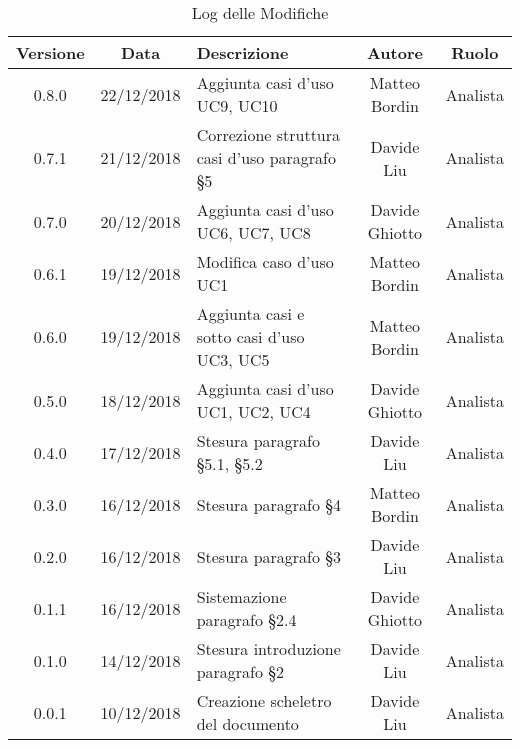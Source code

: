 \begin{table}[h!] %
            \centering
            \renewcommand{\arraystretch}{2}
            \begin{tabular}{|c|c|p{5cm}|c|c|} %
                \rowcolor{orange!50} %
        		\hline
        		\textbf{Versione} & \textbf{Data} & \textbf{Descrizione} & \textbf{Autore} & \textbf{Ruolo} \\
                \hline
                0.8.0 & 22/12/2018 & Aggiunta casi d’uso UC9, UC10 & Matteo Bordin & Analista \\
                \hline
                0.7.1 & 21/12/2018 & Correzione struttura casi d’uso paragrafo §5 & Davide Liu & Analista \\
                \hline
                0.7.0 & 20/12/2018 & Aggiunta casi d’uso UC6, UC7, UC8 & Davide Ghiotto & Analista \\
                \hline
                0.6.1 & 19/12/2018 & Modifica caso d’uso UC1 & Matteo Bordin & Analista \\
                \hline
                0.6.0 & 19/12/2018 & Aggiunta casi e sotto casi d’uso UC3, UC5 & Matteo Bordin & Analista \\
                \hline
                0.5.0 & 18/12/2018 & Aggiunta casi d’uso UC1, UC2, UC4 & Davide Ghiotto & Analista \\
                \hline
                0.4.0 & 17/12/2018 & Stesura paragrafo §5.1, §5.2 & Davide Liu & Analista \\
                \hline
                0.3.0 & 16/12/2018 & Stesura paragrafo §4 & Matteo Bordin & Analista \\
                \hline
                0.2.0 & 16/12/2018 & Stesura paragrafo §3 & Davide Liu & Analista \\
                \hline
                0.1.1 & 16/12/2018 & Sistemazione  paragrafo §2.4 & Davide Ghiotto & Analista \\
                \hline 
                0.1.0 & 14/12/2018 & Stesura introduzione paragrafo §2 & Davide Liu & Analista \\
                \hline
                0.0.1 & 10/12/2018 & Creazione scheletro del documento & Davide Liu & Analista \\
                \hline
                
                
                
                
        \end{tabular}
        \caption{Log delle Modifiche} %
        \label{tab:Log delle modifiche2}
\end{table}
